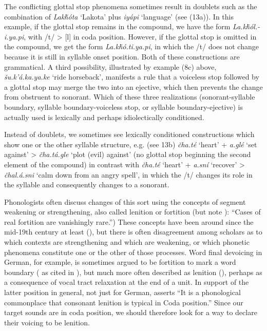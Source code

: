 \documentclass[output=paper]{LSP/langsci}
\begin{document}
The conflicting glottal stop phenomena sometimes result in doublets such as the combination of \textit{Lak\v{h}\'ota} `Lakota' plus \textit{iy\'api} `language' (see (13a)). In this example, if the glottal stop remains in the compound, we have the form \textit{La.k\v{h}\'ol.- i.ya.pi}, with /t/ > [l] in coda position. However, if the glottal stop is omitted in the compound, we get the form \textit{La.k\v{h}\'o.ti.ya.pi}, in which the /t/ does not change because it is still in syllable onset position. Both of these constructions are grammatical. A third possibility, illustrated by example (8c) above, \textit{\v{s}u.k'\'a.ka.ya.ke} `ride horseback', manifests a rule that a voiceless stop followed by a glottal stop may merge the two into an ejective, which then prevents the change from obstruent to sonorant. Which of these three realizations (sonorant-syllable boundary, syllable boundary-voiceless stop, or syllable boundary-ejective) is actually used is lexically and perhaps idiolectically conditioned.

Instead of doublets, we sometimes see lexically conditioned constructions which show one or the other syllable structure, e.g. (see 13b) \textit{\v{c}ha.t\'e} `heart' + \textit{a.gl\'e} `set against' > \textit{\v{c}ha.t\'a.gle} `plot (evil) against' (no glottal stop beginning the second element of the compound) in contrast with \textit{\v{c}ha.t\'e} `heart' + \textit{a.sn\'i} `recover' > \textit{\v{c}hal.\'a.sni} `calm down from an angry spell', in which the /t/ changes its role in the syllable and consequently changes to a sonorant.

Phonologists often discuss changes of this sort using the concepts of segment weakening or strengthening, also called lenition or fortition (but note \citealt[10]{Honeybone2008}): ``Cases of real fortition are vanishingly rare.'') These concepts have been around since the mid-19th century at least (\citealt{Honeybone2008}), but there is often disagreement among scholars as to which contexts are strengthening and which are weakening, or which phonetic phenomena constitute one or the other of those processes. Word final devoicing in German, for example, is sometimes argued to be fortition to mark a word boundary (\citealt{IversonSalmons2007} as cited in \citealt{Harris2009}), but much more often described as lenition (\citealt{Harris2009}), perhaps as a consequence of vocal tract relaxation at the end of a unit. In support of the latter position in general, not just for German, \citet[112]{Szigetvari2008} asserts ``It is a phonological commonplace that consonant lenition is typical in Coda position.'' Since our target sounds are in coda position, we should therefore look for a way to declare their voicing to be lenition.
\end{document}
